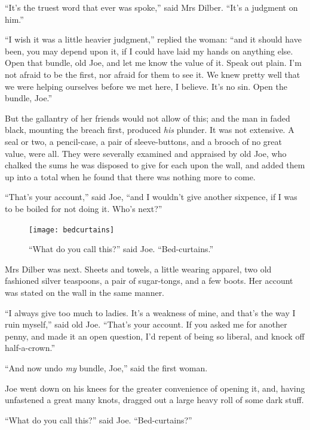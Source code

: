 \documentclass[paper=5.5in:8.5in,BCOR=5mm,twoside,DIV=calc,12pt,usegeometry]{scrbook} %
\begin{document}
\enquote{It's the truest word that ever was spoke,} said Mrs Dilber. \enquote{It's a judgment on him.}

\enquote{I wish it was a little heavier judgment,} replied the woman: \enquote{and it should have been, you may depend upon it, if I could have laid my hands on anything else. Open that bundle, old Joe, and let me know the value of it. Speak out plain. I'm not afraid to be the first, nor afraid for them to see it. We knew pretty well that we were helping ourselves before we met here, I believe. It's no sin. Open the bundle, Joe.}

But the gallantry of her friends would not allow of this; and the man in faded black, mounting the breach first, produced \textit{his} plunder. It was not extensive. A seal or two, a pencil-case, a pair of sleeve-buttons, and a brooch of no great value, were all. They were severally examined and appraised by old Joe, who chalked the sums he was disposed to give for each upon the wall, and added them up into a total when he found that there was nothing more to come.

\enquote{That's your account,} said Joe, \enquote{and I wouldn't give another sixpence, if I was to be boiled for not doing it. Who's next?}

\begin{figure}[p]
\begin{minipage}[c]{\linewidth}
\texttt{[image: bedcurtains]}
\caption*{\enquote{What do you call this?} said Joe. \enquote{Bed-curtains.}}
\end{minipage}
\end{figure}

Mrs Dilber was next. Sheets and towels, a little wearing apparel, two old fashioned silver teaspoons, a pair of sugar-tongs, and a few boots. Her account was stated on the wall in the same manner.

\enquote{I always give too much to ladies. It's a weakness of mine, and that's the way I ruin myself,} said old Joe. \enquote{That's your account. If you asked me for another penny, and made it an open question, I'd repent of being so liberal, and knock off half-a-crown.}

\enquote{And now undo \textit{my} bundle, Joe,} said the first woman.

Joe went down on his knees for the greater convenience of opening it, and, having unfastened a great many knots, dragged out a large heavy roll of some dark stuff.

\enquote{What do you call this?} said Joe. \enquote{Bed-curtains?}
\end{document}
